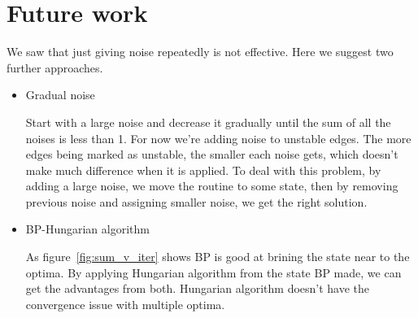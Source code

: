 \section{Future work}

We saw that just giving noise repeatedly is not effective. 
Here we suggest two further approaches. 


\begin{itemize}
\item
Gradual noise

Start with a large noise and decrease it gradually until the sum of all the noises is less than 1.
For now we're adding noise to unstable edges. 
The more edges being marked as unstable, the smaller each noise gets, which doesn't make much difference when it is applied. 
To deal with this problem, by adding a large noise, we move the routine to some state, then by removing previous noise and assigning smaller noise, we get the right solution.


\item
BP-Hungarian algorithm

As figure~\ref{fig:sum_v_iter} shows BP is good at brining the state near to the optima. By applying Hungarian algorithm from the state BP made, we can get the advantages from both. 
Hungarian algorithm doesn't have the convergence issue with multiple optima. 



\end{itemize}
